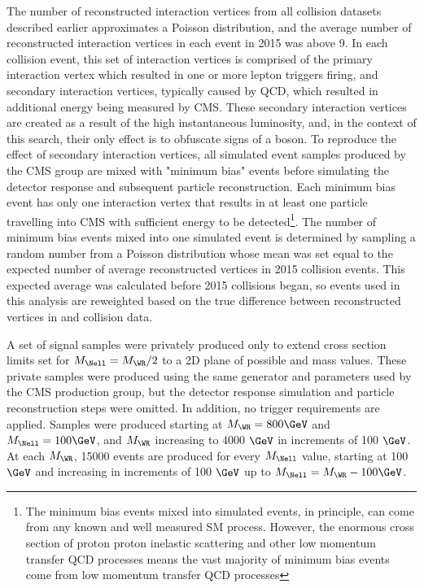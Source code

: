 The number of reconstructed interaction vertices from all collision datasets described
earlier approximates a Poisson distribution, and the average number of reconstructed
interaction vertices in each event in 2015 was above 9.  In each collision event, this
set of interaction vertices is comprised of the primary interaction vertex which
resulted in one or more lepton triggers firing, and secondary interaction vertices,
typically caused by QCD, which resulted in additional energy being measured by CMS.
These secondary interaction vertices are created as a result of the high instantaneous
luminosity, and, in the context of this search, their only effect is to obfuscate
signs of a \WR boson.  To reproduce the effect of secondary interaction vertices, all
simulated event samples produced by the CMS \MC group are mixed with "minimum bias"
events before simulating the detector response and subsequent particle reconstruction.
Each minimum bias event has only one interaction vertex that results in at least
one particle travelling into CMS with sufficient energy to be detected\footnote{The minimum
bias events mixed into simulated events, in principle, can come from any known and
well measured SM process.  However, the enormous cross section of proton proton
inelastic scattering and other low momentum transfer QCD processes means the vast
majority of minimum bias events come from low momentum transfer QCD processes}.
The number of minimum bias events mixed into one simulated event is determined
by sampling a random number from a Poisson distribution whose mean was set equal
to the expected number of average reconstructed vertices in 2015 collision events.
This expected average was calculated before 2015 collisions began, so \MC events 
used in this analysis are reweighted based on the true difference between reconstructed
vertices in \MC and collision data.

A set of \WR \MC signal samples were privately produced only to extend \WR cross
section limits set for $M_{\Nell} = M_{\WR}/2$ to a 2D plane of possible \WR
and \Nell mass values.  These private samples were produced using the same
\PYTHIA generator and parameters used by the CMS \MC production group, but the
detector response simulation and particle reconstruction steps were omitted.
In addition, no trigger requirements are applied.
Samples were produced starting at $M_{\WR} = 800 \GeV$
and $M_{\Nell} = 100 \GeV$, and $M_{\WR}$ increasing to 4000 $\GeV$ in increments
of 100 $\GeV$.  At each $M_{\WR}$, 15000 events are produced for every $M_{\Nell}$
value, starting at 100 $\GeV$ and increasing in increments of 100 $\GeV$ up to
$M_{\Nell} = M_{\WR} - 100 \GeV$.


